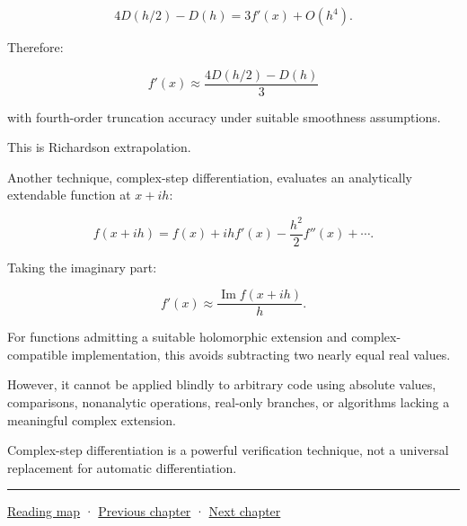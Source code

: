 \[
4D(h/2)-D(h) = 3f'(x)+O(h^4).
\]

Therefore:

\[
\boxed{ f'(x)\approx \frac{4D(h/2)-D(h)}3 }
\]

with fourth-order truncation accuracy under suitable smoothness assumptions.

This is Richardson extrapolation.

Another technique, complex-step differentiation, evaluates an analytically extendable function at \(x+ih\):

\[
f(x+ih) = f(x)+ihf'(x) -\frac{h^2}{2}f''(x)+\cdots.
\]

Taking the imaginary part:

\[
\boxed{ f'(x)\approx \frac{\operatorname{Im}f(x+ih)}h }.
\]

For functions admitting a suitable holomorphic extension and complex-compatible implementation, this avoids subtracting two nearly equal real values.

However, it cannot be applied blindly to arbitrary code using absolute values, comparisons, nonanalytic operations, real-only branches, or algorithms lacking a meaningful complex extension.

Complex-step differentiation is a powerful verification technique, not a universal replacement for automatic differentiation.

\begin{center}\rule{0.5\linewidth}{0.5pt}\end{center}

\hyperref[volume-reading-map]{Reading map} · \hyperref[02-foundations-ii-ch024-waiting-times-covariance-and-matrix-decomposition]{Previous chapter} · \hyperref[02-foundations-ii-ch026-matrix-functions-and-nonlinear-least-squares]{Next chapter}
